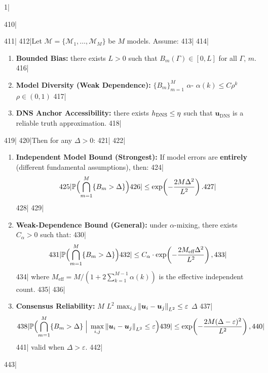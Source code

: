 1|\documentclass[11pt,a4paper]{article}
\begin{document}
410|\begin{theorem}
411|\label{thm:audit}
412|Let $\mathscr{M} = \{\mathcal{M}_1, \dots, \mathcal{M}_M\}$ be $M$ models. Assume:
413|
414|\begin{enumerate}[label=(A\arabic*),leftmargin=*]
415|  \item \textbf{Bounded Bias: } there exists $L > 0$ such that $B_m(\Gamma) \in [0, L]$ for all $\Gamma$, $m$.
416|  \item \textbf{Model Diversity (Weak Dependence): }  $\{B_m\}_{m=1}^{M}$  $\alpha$- $\alpha(k) \leq C \rho^k$ $\rho \in (0, 1)$
417|  \item \textbf{DNS Anchor Accessibility: } there exists $h_{\text{DNS}} \leq \eta$ such that $\bm{u}_{\text{DNS}}$ is a reliable truth approximation.
418|\end{enumerate}
419|
420|Then for any $\Delta > 0$:
421|
422|\begin{enumerate}[label=(\roman*),leftmargin=*]
423|  \item \textbf{Independent Model Bound (Strongest): } If model errors are \textbf{entirely} (different fundamental assumptions), then:
424|  \begin{equation}\label{eq:audit_independent}
425|    \mathbb{P}\Bigl(\bigcap_{m=1}^{M} \{B_m > \Delta\}\Bigr)
426|    \leq \exp\!\left(-\frac{2M\Delta^2}{L^2}\right).
427|  \end{equation}
428|
429|  \item \textbf{Weak-Dependence Bound (General): } under $\alpha$-mixing, there exists $C_{\alpha} > 0$ such that:
430|  \begin{equation}\label{eq:audit_mixing}
431|    \mathbb{P}\Bigl(\bigcap_{m=1}^{M} \{B_m > \Delta\}\Bigr)
432|    \leq C_{\alpha} \cdot \exp\!\left(-\frac{2 M_{\text{eff}} \Delta^2}{L^2}\right),
433|  \end{equation}
434|  where $M_{\text{eff}} = M / (1 + 2\sum_{k=1}^{M-1} \alpha(k))$ is the effective independent count.
435|
436|  \item \textbf{Consensus Reliability: }  $M$  $L^2$  $\max_{i,j} \left\lVert\bm{u}_i - \bm{u}_j\right\rVert_{L^2} \leq \varepsilon$\textbf{} $\Delta$
437|  \begin{equation}\label{eq:audit_consensus}
438|    \mathbb{P}\Bigl(\bigcap_{m=1}^{M} \{B_m > \Delta\} \;\Big|\; \max_{i,j}\left\lVert\bm{u}_i - \bm{u}_j\right\rVert_{L^2} \leq \varepsilon\Bigr)
439|    \leq \exp\!\left(-\frac{2M(\Delta - \varepsilon)^2}{L^2}\right),
440|  \end{equation}
441|  valid when $\Delta > \varepsilon$.
442|\end{enumerate}
443|\end{theorem}
\end{document}

